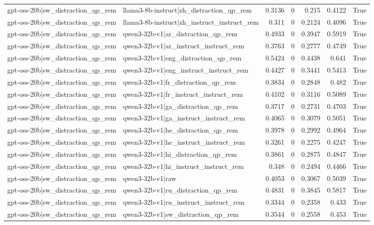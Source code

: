 \begin{table}
\begin{tabular}{l l r r r r l}
gpt-oss-20b|sw_distraction_qp_rem & llama3-8b-instruct|zh_distraction_qp_rem & 0.3136 & 0 & 0.215 & 0.4122 & True \\
gpt-oss-20b|sw_distraction_qp_rem & llama3-8b-instruct|zh_instruct_instruct_rem & 0.311 & 0 & 0.2124 & 0.4096 & True \\
gpt-oss-20b|sw_distraction_qp_rem & qwen3-32b-v1|ar_distraction_qp_rem & 0.4933 & 0 & 0.3947 & 0.5919 & True \\
gpt-oss-20b|sw_distraction_qp_rem & qwen3-32b-v1|ar_instruct_instruct_rem & 0.3763 & 0 & 0.2777 & 0.4749 & True \\
gpt-oss-20b|sw_distraction_qp_rem & qwen3-32b-v1|eng_distraction_qp_rem & 0.5424 & 0 & 0.4438 & 0.641 & True \\
gpt-oss-20b|sw_distraction_qp_rem & qwen3-32b-v1|eng_instruct_instruct_rem & 0.4427 & 0 & 0.3441 & 0.5413 & True \\
gpt-oss-20b|sw_distraction_qp_rem & qwen3-32b-v1|fr_distraction_qp_rem & 0.3834 & 0 & 0.2848 & 0.482 & True \\
gpt-oss-20b|sw_distraction_qp_rem & qwen3-32b-v1|fr_instruct_instruct_rem & 0.4102 & 0 & 0.3116 & 0.5089 & True \\
gpt-oss-20b|sw_distraction_qp_rem & qwen3-32b-v1|ga_distraction_qp_rem & 0.3717 & 0 & 0.2731 & 0.4703 & True \\
gpt-oss-20b|sw_distraction_qp_rem & qwen3-32b-v1|ga_instruct_instruct_rem & 0.4065 & 0 & 0.3079 & 0.5051 & True \\
gpt-oss-20b|sw_distraction_qp_rem & qwen3-32b-v1|he_distraction_qp_rem & 0.3978 & 0 & 0.2992 & 0.4964 & True \\
gpt-oss-20b|sw_distraction_qp_rem & qwen3-32b-v1|he_instruct_instruct_rem & 0.3261 & 0 & 0.2275 & 0.4247 & True \\
gpt-oss-20b|sw_distraction_qp_rem & qwen3-32b-v1|hi_distraction_qp_rem & 0.3861 & 0 & 0.2875 & 0.4847 & True \\
gpt-oss-20b|sw_distraction_qp_rem & qwen3-32b-v1|hi_instruct_instruct_rem & 0.348 & 0 & 0.2494 & 0.4466 & True \\
gpt-oss-20b|sw_distraction_qp_rem & qwen3-32b-v1|raw & 0.4053 & 0 & 0.3067 & 0.5039 & True \\
gpt-oss-20b|sw_distraction_qp_rem & qwen3-32b-v1|ru_distraction_qp_rem & 0.4831 & 0 & 0.3845 & 0.5817 & True \\
gpt-oss-20b|sw_distraction_qp_rem & qwen3-32b-v1|ru_instruct_instruct_rem & 0.3344 & 0 & 0.2358 & 0.433 & True \\
gpt-oss-20b|sw_distraction_qp_rem & qwen3-32b-v1|sw_distraction_qp_rem & 0.3544 & 0 & 0.2558 & 0.453 & True \\

\end{tabular}
\end{table}

